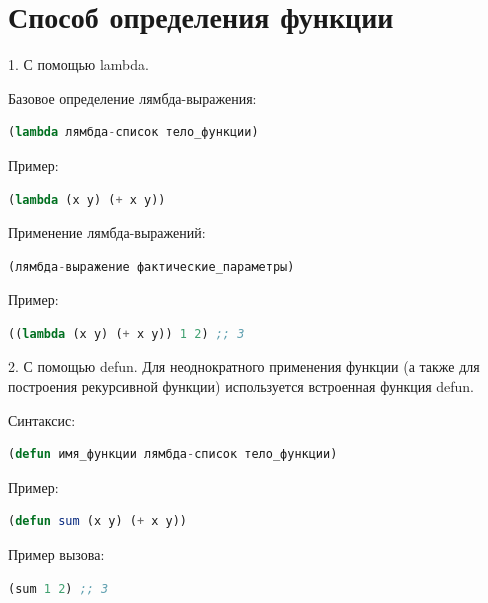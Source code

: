\begin{figure}[ht!]
\end{figure}

\section{Способ определения функции}

1. С помощью lambda. 

Базовое определение лямбда-выражения:

\begin{lstlisting}[language=Lisp]
	(lambda лямбда-список тело_функции)
\end{lstlisting}

Пример:

\begin{lstlisting}[language=Lisp]
	(lambda (x y) (+ x y))
\end{lstlisting}

Применение лямбда-выражений:

\begin{lstlisting}[language=Lisp]
	(лямбда-выражение фактические_параметры)
\end{lstlisting}

Пример:

\begin{lstlisting}[language=Lisp]
	((lambda (x y) (+ x y)) 1 2) ;; 3
\end{lstlisting}

2. С помощью defun. 
Для неоднократного применения функции (а также для построения
рекурсивной функции) используется встроенная функция defun.

Синтаксис:

\begin{lstlisting}[language=Lisp]
	(defun имя_функции лямбда-список тело_функции)
\end{lstlisting}

Пример:

\begin{lstlisting}[language=Lisp]
	(defun sum (x y) (+ x y))
\end{lstlisting}

Пример вызова:

\begin{lstlisting}[language=Lisp]
	(sum 1 2) ;; 3
\end{lstlisting}


